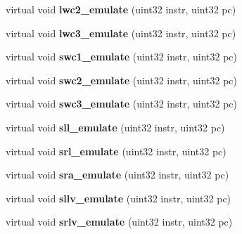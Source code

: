 \begin{DoxyCompactItemize}
\item 
\hypertarget{classCPU_ab970502c538f46c135abdd5f4de9b81a}{
virtual void {\bfseries lwc2\_\-emulate} (uint32 instr, uint32 pc)}
\label{classCPU_ab970502c538f46c135abdd5f4de9b81a}

\item 
\hypertarget{classCPU_afd81fbeb5e17dfd25d9179bdc7d14db7}{
virtual void {\bfseries lwc3\_\-emulate} (uint32 instr, uint32 pc)}
\label{classCPU_afd81fbeb5e17dfd25d9179bdc7d14db7}

\item 
\hypertarget{classCPU_ad870b60115457a544ea3a918d8857ff1}{
virtual void {\bfseries swc1\_\-emulate} (uint32 instr, uint32 pc)}
\label{classCPU_ad870b60115457a544ea3a918d8857ff1}

\item 
\hypertarget{classCPU_a865e0b2b102058612e50e881cba1d2c2}{
virtual void {\bfseries swc2\_\-emulate} (uint32 instr, uint32 pc)}
\label{classCPU_a865e0b2b102058612e50e881cba1d2c2}

\item 
\hypertarget{classCPU_a203756a36c870eb6a021e4b973aaa323}{
virtual void {\bfseries swc3\_\-emulate} (uint32 instr, uint32 pc)}
\label{classCPU_a203756a36c870eb6a021e4b973aaa323}

\item 
\hypertarget{classCPU_aad350e5ee056964fd731a202cc78bd89}{
virtual void {\bfseries sll\_\-emulate} (uint32 instr, uint32 pc)}
\label{classCPU_aad350e5ee056964fd731a202cc78bd89}

\item 
\hypertarget{classCPU_ac64c37e5dfdb289b3afd52edc2d149da}{
virtual void {\bfseries srl\_\-emulate} (uint32 instr, uint32 pc)}
\label{classCPU_ac64c37e5dfdb289b3afd52edc2d149da}

\item 
\hypertarget{classCPU_a741bf7a0064e8537e6b2928a87d884f7}{
virtual void {\bfseries sra\_\-emulate} (uint32 instr, uint32 pc)}
\label{classCPU_a741bf7a0064e8537e6b2928a87d884f7}

\item 
\hypertarget{classCPU_a70107be5ef7958b4f8dcb16dc6afb508}{
virtual void {\bfseries sllv\_\-emulate} (uint32 instr, uint32 pc)}
\label{classCPU_a70107be5ef7958b4f8dcb16dc6afb508}

\item 
\hypertarget{classCPU_a381d274b6a98e34bee7eaee59b9fcb25}{
virtual void {\bfseries srlv\_\-emulate} (uint32 instr, uint32 pc)}
\label{classCPU_a381d274b6a98e34bee7eaee59b9fcb25}


\end{DoxyCompactItemize}
